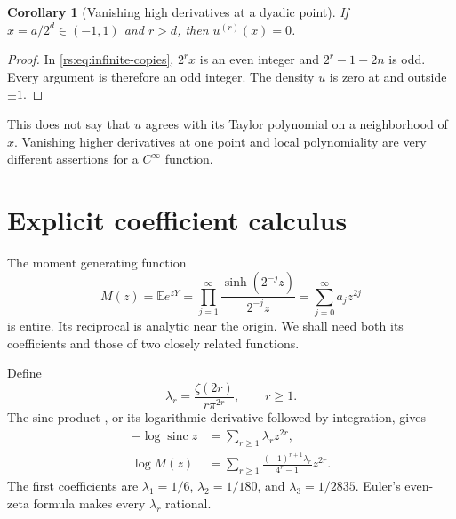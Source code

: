 \documentclass[11pt,a4paper,oneside,openany]{book}
\numberwithin{equation}{chapter}
\newtheorem{corollary}[theorem]{Corollary}
\theoremstyle{definition}
\theoremstyle{remark}
\newcommand{\E}{\mathbb E}
\DeclareMathOperator{\sinc}{sinc}
\begin{document}
\begin{corollary}[Vanishing high derivatives at a dyadic point]\label{rs:cor:dyadic-jet}
If $x=a/2^d\in(-1,1)$ and $r>d$, then $u^{(r)}(x)=0$.
\end{corollary}
\begin{proof}
In \eqref{rs:eq:infinite-copies}, $2^rx$ is an even integer and
$2^r-1-2n$ is odd. Every argument is therefore an odd integer.
The density $u$ is zero at and outside $\pm1$.
\end{proof}

This does not say that $u$ agrees with its Taylor polynomial on a
neighborhood of $x$. Vanishing higher derivatives at one point and
local polynomiality are very different assertions for a $C^\infty$
function.
\chapter{Explicit coefficient calculus}\label{rs:sec:coefficients}

The moment generating function
\begin{equation}
 M(z)=\E e^{zY}=\prod_{j=1}^{\infty}
          \frac{\sinh(2^{-j}z)}{2^{-j}z}
      =\sum_{j=0}^{\infty}a_jz^{2j}
 \label{rs:eq:MGF}
\end{equation}
is entire. Its reciprocal is analytic near the origin. We shall need
both its coefficients and those of two closely related functions.

Define
\begin{equation}
 \lambda_r=\frac{\zeta(2r)}{r\pi^{2r}},\qquad r\geq1.
 \label{rs:eq:lambda}
\end{equation}
The sine product \cite[Sec.~4.22]{dlmf422}, or its logarithmic derivative
followed by integration, gives
\begin{align}
 -\log\sinc z&=\sum_{r\geq1}\lambda_rz^{2r},\label{rs:eq:log-sinc}\\
 \log M(z)&=\sum_{r\geq1}
     \frac{(-1)^{r+1}\lambda_r}{4^r-1}z^{2r}.
 \label{rs:eq:logM}
\end{align}
The first coefficients are
$\lambda_1=1/6$, $\lambda_2=1/180$, and $\lambda_3=1/2835$.
Euler's even-zeta formula makes every $\lambda_r$ rational.
\end{document}
